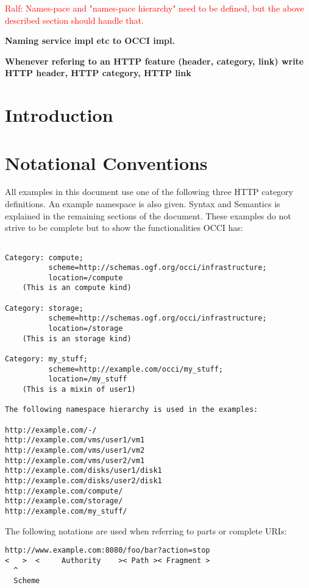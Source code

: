 \documentclass[10pt,a4paper]{article}
\newcommand{\ralf}[1]{\textcolor{red}{Ralf: #1}}
\begin{document}
\ralf{Names-pace and "names-pace hierarchy" need to be defined, but the above
described section should handle that.}

\textbf{Naming service impl etc to OCCI impl.}

\textbf{Whenever refering to an HTTP feature (header, category, link) write HTTP header, HTTP category, HTTP link}

\newpage
\tableofcontents
\newpage

\section{Introduction}


\section{Notational Conventions}


All examples in this document use one of the following three HTTP
category definitions. An example namespace is also given. Syntax and
Semantics is explained in the remaining sections of the
document. These examples do not strive to be complete but to show the
functionalities OCCI has:

\begin{verbatim}

Category: compute;
          scheme=http://schemas.ogf.org/occi/infrastructure;
          location=/compute 
    (This is an compute kind)

Category: storage;
          scheme=http://schemas.ogf.org/occi/infrastructure;
          location=/storage 
    (This is an storage kind)

Category: my_stuff;
          scheme=http://example.com/occi/my_stuff;
          location=/my_stuff 
    (This is a mixin of user1)

The following namespace hierarchy is used in the examples:

http://example.com/-/
http://example.com/vms/user1/vm1
http://example.com/vms/user1/vm2
http://example.com/vms/user2/vm1
http://example.com/disks/user1/disk1
http://example.com/disks/user2/disk1
http://example.com/compute/
http://example.com/storage/
http://example.com/my_stuff/
\end{verbatim}

The following notations are used when referring to parts or complete
URIs:

\begin{verbatim}
http://www.example.com:8080/foo/bar?action=stop
<   >  <     Authority    >< Path >< Fragment >
  ^
  Scheme
\end{verbatim}
\end{document}
